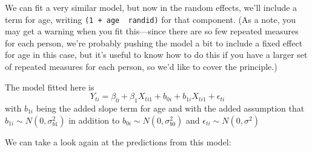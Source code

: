 \documentclass[
]{book}
\newenvironment{Shaded}{\begin{snugshade}}{\end{snugshade}}
\newcommand{\DataTypeTok}[1]{\textcolor[rgb]{0.13,0.29,0.53}{#1}}
\newcommand{\DecValTok}[1]{\textcolor[rgb]{0.00,0.00,0.81}{#1}}
\newcommand{\KeywordTok}[1]{\textcolor[rgb]{0.13,0.29,0.53}{\textbf{#1}}}
\newcommand{\NormalTok}[1]{#1}
\newcommand{\OperatorTok}[1]{\textcolor[rgb]{0.81,0.36,0.00}{\textbf{#1}}}
\newcommand{\StringTok}[1]{\textcolor[rgb]{0.31,0.60,0.02}{#1}}
\begin{document}
We can fit a very similar model, but now in the random effects, we'll include
a term for age, writing \texttt{(1\ +\ age\ \textbar{}\ randid)} for that component. (As a note, you
may get a warning when you fit this---since there are so few repeated measures
for each person, we're probably pushing the model a bit to include a fixed
effect for age in this case, but it's useful to know how to do this if you
have a larger set of repeated measures for each person, so we'd like to
cover the principle.)

\begin{Shaded}
\end{Shaded}

The model fitted here is
\[
Y_{ti} = \beta_{0} + \beta_{1}X_{ti1} + b_{0i} + b_{1i}X_{ti1} + \epsilon_{ti}
\]
with \(b_{1i}\) being the added slope term for age and with the added assumption
that \(b_{1i} \sim N(0,\sigma_{b1}^2)\) in addition to \(b_{0i} \sim N(0,\sigma_{b0}^2)\)
and \(\epsilon_{ti} \sim N(0,\sigma^2)\)

We can take a look again at the predictions from this model:

\begin{Shaded}
\end{Shaded}
\end{document}
